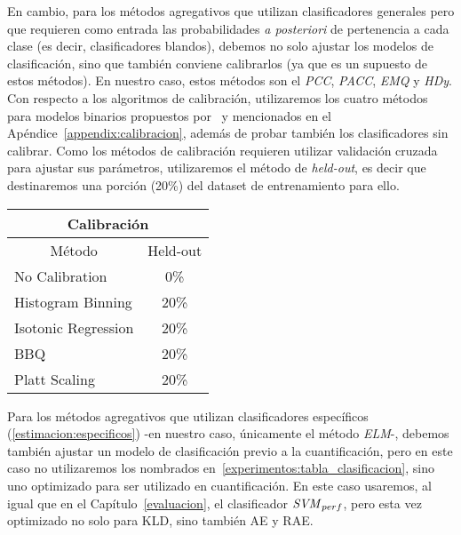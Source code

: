 En cambio, para los métodos agregativos que utilizan clasificadores generales
pero que requieren como entrada las probabilidades {\it a posteriori\/} de
pertenencia a cada clase (es decir, clasificadores blandos), debemos no solo
ajustar los modelos de clasificación, sino que también conviene calibrarlos (ya
que es un supuesto de estos métodos). En nuestro caso, estos métodos son el {\it
PCC}, {\it PACC}, {\it EMQ\/} y {\it HDy}. Con respecto a los algoritmos de
calibración, utilizaremos los cuatro métodos para modelos binarios propuestos
por~\citet{guo2017calibration} y mencionados en el
Apéndice~\ref{appendix:calibracion}, además de probar también los clasificadores
sin calibrar. Como los métodos de calibración requieren utilizar validación
cruzada para ajustar sus parámetros, utilizaremos el método de {\it held-out},
es decir que destinaremos una porción (20\%) del dataset de entrenamiento para
ello.
\begin{center}
    \begin{tabular}{|lc|}
        \hline
        \multicolumn{2}{|c|}{Calibración}                    \\ \hline
        \multicolumn{1}{|c|}{Método}              & Held-out \\ \hline
        \multicolumn{1}{|l|}{No Calibration}      & 0\%      \\
        \multicolumn{1}{|l|}{Histogram Binning}   & 20\%     \\
        \multicolumn{1}{|l|}{Isotonic Regression} & 20\%     \\
        \multicolumn{1}{|l|}{BBQ}                 & 20\%     \\
        \multicolumn{1}{|l|}{Platt Scaling}       & 20\%     \\ \hline
    \end{tabular}
    \label{experimentos:tabla_calibracion}
\end{center}

Para los métodos agregativos que utilizan clasificadores específicos
(\ref{estimacion:especificos}) -en nuestro caso, únicamente el método {\it
ELM\/}-, debemos también ajustar un modelo de clasificación previo a la
cuantificación, pero en este caso no utilizaremos los nombrados
en~\ref{experimentos:tabla_clasificacion}, sino uno optimizado para ser
utilizado en cuantificación. En este caso usaremos, al igual que en el
Capítulo~\ref{evaluacion}, el clasificador \({\it SVM \/}_{perf}\), pero esta
vez optimizado no solo para KLD, sino también AE y RAE.

